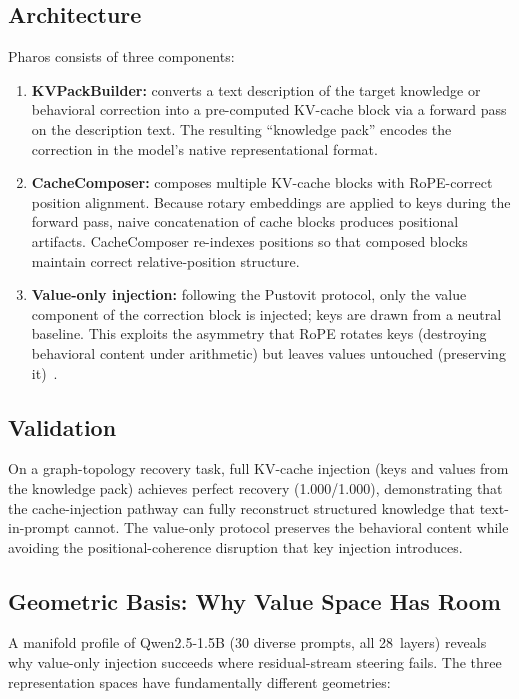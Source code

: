 \documentclass[11pt,a4paper]{article}
\begin{document}
\subsection{Architecture}

Pharos consists of three components:
\begin{enumerate}[nosep]
  \item \textbf{KVPackBuilder:} converts a text description of the target
    knowledge or behavioral correction into a pre-computed KV-cache block via a
    forward pass on the description text. The resulting ``knowledge pack''
    encodes the correction in the model's native representational format.
  \item \textbf{CacheComposer:} composes multiple KV-cache blocks with
    RoPE-correct position alignment. Because rotary embeddings are applied to
    keys during the forward pass, naive concatenation of cache blocks produces
    positional artifacts. CacheComposer re-indexes positions so that composed
    blocks maintain correct relative-position structure.
  \item \textbf{Value-only injection:} following the Pustovit protocol, only the
    value component of the correction block is injected; keys are drawn from a
    neutral baseline. This exploits the asymmetry that RoPE rotates keys
    (destroying behavioral content under arithmetic) but leaves values untouched
    (preserving it)~\citep{pustovit2026knowledge}.
\end{enumerate}

\subsection{Validation}

On a graph-topology recovery task, full KV-cache injection (keys and values
from the knowledge pack) achieves perfect recovery (1.000/1.000), demonstrating
that the cache-injection pathway can fully reconstruct structured knowledge
that text-in-prompt cannot. The value-only protocol preserves the behavioral
content while avoiding the positional-coherence disruption that key injection
introduces.

\subsection{Geometric Basis: Why Value Space Has Room}

A manifold profile of Qwen2.5-1.5B (30 diverse prompts, all 28~layers) reveals
why value-only injection succeeds where residual-stream steering fails. The
three representation spaces have fundamentally different geometries:
\end{document}
